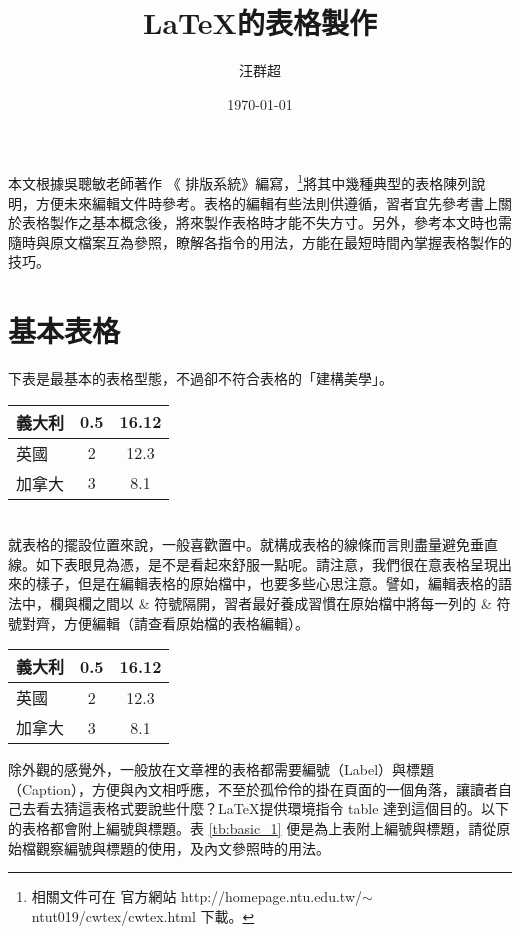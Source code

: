 \title{ \LaTeX  {\MB 的表格製作}}
\author{{\SM 汪群超}}
\date{{\TT \today}} 	 

\maketitle
\fontsize{12}{22pt}\selectfont

本文根據吳聰敏老師著作 《\cw{} 排版系統》編寫，\footnote{相關文件可在 \cw{} 官方網站  http://homepage.ntu.edu.tw/$\sim$ntut019/cwtex/cwtex.html 下載。}將其中幾種典型的表格陳列說明，方便未來編輯文件時參考。表格的編輯有些法則供遵循，習者宜先參考書上關於表格製作之基本概念後，將來製作表格時才能不失方寸。另外，參考本文時也需隨時與原文檔案互為參照，瞭解各指令的用法，方能在最短時間內掌握表格製作的技巧。


\section{基本表格}
下表是最基本的表格型態，不過卻不符合表格的「建構美學」。\\

\begin{tabular}{|l|c|c|}%
\hline  %
  義大利	& 0.5	& 16.12		\\\hline  %
  英國	& 2     	& 12.3		\\\hline
  加拿大	& 3     	& 8.1		\\\hline
\end{tabular}\\

就表格的擺設位置來說，一般喜歡置中。就構成表格的線條而言則盡量避免垂直線。如下表眼見為憑，是不是看起來舒服一點呢。請注意，我們很在意表格呈現出來的樣子，但是在編輯表格的原始檔中，也要多些心思注意。譬如，編輯表格的語法中，欄與欄之間以 \& 符號隔開，習者最好養成習慣在原始檔中將每一列的 \& 符號對齊，方便編輯（請查看原始檔的表格編輯）。\\

\begin{center} %
\begin{tabular}{lcc}  %
\hline
  義大利	& 0.5	& 16.12		\\\hline  %
  英國   & 2     	& 12.3		\\\hline
  加拿大 	& 3     	& 8.1		\\\hline
\end{tabular}
\end{center}
\bigskip
除外觀的感覺外，一般放在文章裡的表格都需要編號（Label）與標題（Caption），方便與內文相呼應，不至於孤伶伶的掛在頁面的一個角落，讓讀者自己去看去猜這表格式要說些什麼？\LaTeX 提供環境指令 {\A table} 達到這個目的。以下的表格都會附上編號與標題。表 \ref{tb:basic_1} 便是為上表附上編號與標題，請從原始檔觀察編號與標題的使用，及內文參照時的用法。

